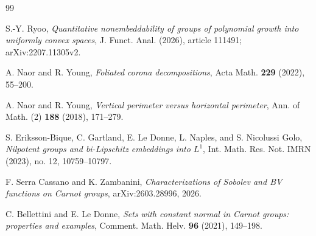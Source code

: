 \documentclass[11pt]{article}
\theoremstyle{remark}
\begin{document}
\begin{thebibliography}{99}

S.-Y. Ryoo,
\emph{Quantitative nonembeddability of groups of polynomial growth into uniformly convex spaces},
J. Funct. Anal. (2026), article 111491; arXiv:2207.11305v2.

A. Naor and R. Young,
\emph{Foliated corona decompositions},
Acta Math. \textbf{229} (2022), 55--200.

A. Naor and R. Young,
\emph{Vertical perimeter versus horizontal perimeter},
Ann. of Math. (2) \textbf{188} (2018), 171--279.

S. Eriksson-Bique, C. Gartland, E. Le Donne, L. Naples, and S. Nicolussi Golo,
\emph{Nilpotent groups and bi-Lipschitz embeddings into \(L^1\)},
Int. Math. Res. Not. IMRN (2023), no. 12, 10759--10797.

F. Serra Cassano and K. Zambanini,
\emph{Characterizations of Sobolev and BV functions on Carnot groups},
arXiv:2603.28996, 2026.

C. Bellettini and E. Le Donne,
\emph{Sets with constant normal in Carnot groups: properties and examples},
Comment. Math. Helv. \textbf{96} (2021), 149--198.

\end{thebibliography}
\end{document}
